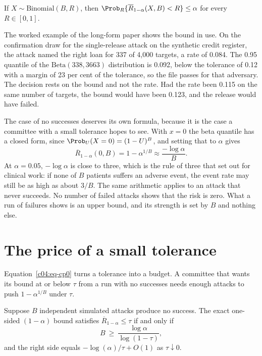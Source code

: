 \begin{proposition}\label{c04:prop-cp}
If $X \sim \mathrm{Binomial}(B,R)$, then
$\Prob_R\{\overline{R}_{1-\alpha}(X,B) < R\} \le \alpha$ for every $R \in [0,1]$.
\end{proposition}

The worked example of the long-form paper shows the bound in use. On the confirmation
draw for the single-release attack on the synthetic credit register, the attack named
the right loan for 337 of 4,000 targets, a rate of 0.084. The 0.95 quantile of the
$\mathrm{Beta}(338, 3663)$ distribution is 0.092, below the tolerance of 0.12 with a
margin of 23 per cent of the tolerance, so the file passes for that adversary.
The decision rests on the bound and not the rate. Had the rate been 0.115 on the same
number of targets, the bound would have been 0.123, and the release would have failed.

The case of no successes deserves its own formula, because it is the case a committee
with a small tolerance hopes to see. With $x = 0$ the beta quantile has a closed form,
since $\Prob_U(X = 0) = (1-U)^B$, and setting that to $\alpha$ gives
\begin{equation}\label{c04:eq-cp0}
\overline{R}_{1-\alpha}(0,B) = 1 - \alpha^{1/B} \approx \frac{-\log\alpha}{B}.
\end{equation}
At $\alpha = 0.05$, $-\log\alpha$ is close to three, which is the rule of three that
\citet{hanley1983} set out for clinical work: if none of $B$ patients suffers an adverse
event, the event rate may still be as high as about $3/B$. The same arithmetic applies
to an attack that never succeeds. No number of failed attacks shows that the risk is
zero. What a run of failures shows is an upper bound, and its strength is set by $B$
and nothing else.

\section{The price of a small tolerance}

Equation~\eqref{c04:eq-cp0} turns a tolerance into a budget. A committee that wants its
bound at or below $\tau$ from a run with no successes needs enough attacks to push
$1 - \alpha^{1/B}$ under $\tau$.

\begin{proposition}\label{c04:prop-cert}
Suppose $B$ independent simulated attacks produce no success. The exact one-sided
$(1-\alpha)$ bound satisfies $\overline{R}_{1-\alpha} \le \tau$ if and only if
\begin{equation}\label{c04:eq-cert}
B \ \ge\ \frac{\log\alpha}{\log(1-\tau)},
\end{equation}
and the right side equals $-\log(\alpha)/\tau + O(1)$ as $\tau \downarrow 0$.
\end{proposition}

